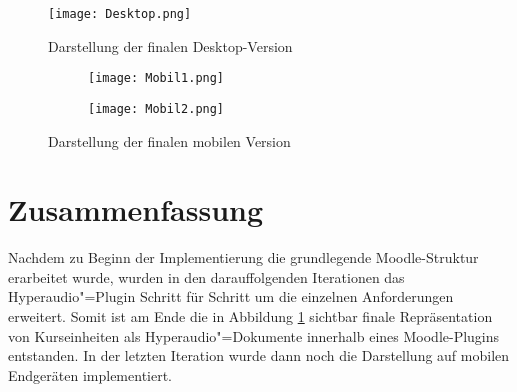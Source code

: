 \begin{figure}[h!]
\texttt{[image: Desktop.png]}
\caption{\label{fig:DesktopFinal}Darstellung der finalen Desktop-Version}
\end{figure}

\begin{figure}[h!]
\begin{subfigure}[c]{0.5\textwidth}
\texttt{[image: Mobil1.png]}
\end{subfigure}%
\begin{subfigure}[c]{0.5\textwidth}
\texttt{[image: Mobil2.png]}
\end{subfigure}
\caption{Darstellung der finalen mobilen Version}
\label{fig:MobilFinal}
\end{figure}

\FloatBarrier

\section{Zusammenfassung}
Nachdem zu Beginn der Implementierung die grundlegende Moodle-Struktur erarbeitet wurde, wurden in den darauffolgenden Iterationen das Hyperaudio"=Plugin Schritt für Schritt um die einzelnen Anforderungen erweitert. Somit ist am Ende die in Abbildung \ref{fig:DesktopFinal} sichtbar finale Repräsentation von Kurseinheiten als Hyperaudio"=Dokumente innerhalb eines Moodle-Plugins entstanden. In der letzten Iteration wurde dann noch die Darstellung auf mobilen Endgeräten implementiert.
